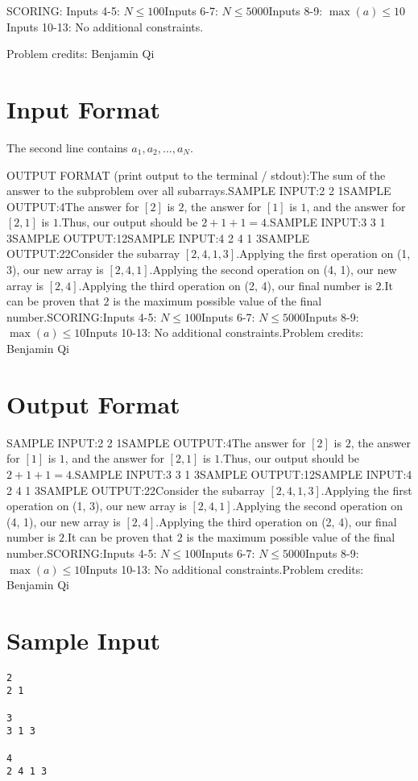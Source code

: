 \documentclass[12pt]{article}
\begin{document}
SCORING:
Inputs 4-5: $N\le 100$Inputs 6-7: $N\le 5000$Inputs 8-9: $\max(a)\le 10$Inputs 10-13: No additional constraints.


Problem credits: Benjamin Qi



\section*{Input Format}
The second line contains $a_1,a_2,\dots,a_N$.

OUTPUT FORMAT (print output to the terminal / stdout):The sum of the answer to the subproblem over all subarrays.SAMPLE INPUT:2
2 1SAMPLE OUTPUT:4The answer for $[2]$ is $2$, the answer for $[1]$ is $1$, and the answer for
$[2, 1]$ is $1$.Thus, our output should be $2+1+1 = 4$.SAMPLE INPUT:3
3 1 3SAMPLE OUTPUT:12SAMPLE INPUT:4
2 4 1 3SAMPLE OUTPUT:22Consider the subarray $[2, 4, 1, 3]$.Applying the first operation on (1, 3), our new array is $[2, 4, 1]$.Applying the second operation on (4, 1), our new array is $[2, 4]$.Applying the third operation on (2, 4), our final number is $2$.It can be proven that $2$ is the maximum possible value of the final number.SCORING:Inputs 4-5: $N\le 100$Inputs 6-7: $N\le 5000$Inputs 8-9: $\max(a)\le 10$Inputs 10-13: No additional constraints.Problem credits: Benjamin Qi

\section*{Output Format}
SAMPLE INPUT:2
2 1SAMPLE OUTPUT:4The answer for $[2]$ is $2$, the answer for $[1]$ is $1$, and the answer for
$[2, 1]$ is $1$.Thus, our output should be $2+1+1 = 4$.SAMPLE INPUT:3
3 1 3SAMPLE OUTPUT:12SAMPLE INPUT:4
2 4 1 3SAMPLE OUTPUT:22Consider the subarray $[2, 4, 1, 3]$.Applying the first operation on (1, 3), our new array is $[2, 4, 1]$.Applying the second operation on (4, 1), our new array is $[2, 4]$.Applying the third operation on (2, 4), our final number is $2$.It can be proven that $2$ is the maximum possible value of the final number.SCORING:Inputs 4-5: $N\le 100$Inputs 6-7: $N\le 5000$Inputs 8-9: $\max(a)\le 10$Inputs 10-13: No additional constraints.Problem credits: Benjamin Qi

\section*{Sample Input}
\begin{verbatim}
2
2 1

3
3 1 3

4
2 4 1 3
\end{verbatim}
\end{document}
